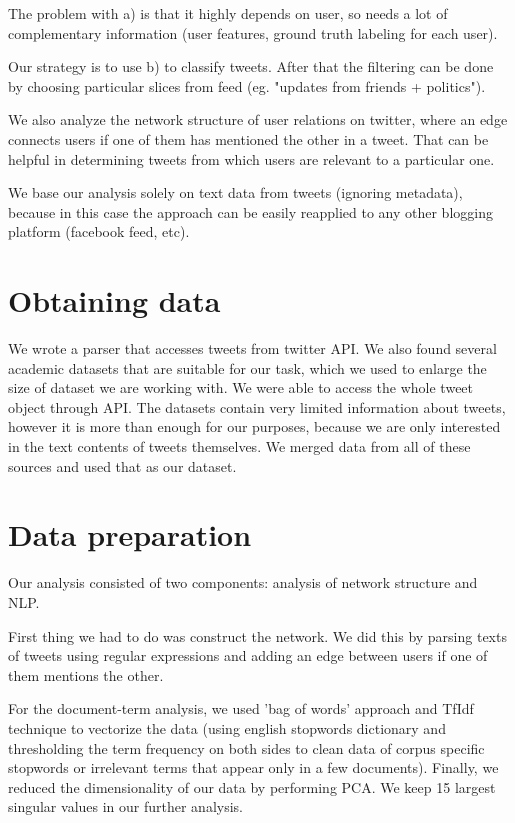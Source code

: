 \documentclass[%
 reprint,
 amsmath,amssymb,
 aps,
]{revtex4-1}
\begin{document}
The problem with a) is that it highly depends on user, so needs a lot of complementary information (user features, ground truth labeling for each user).

Our strategy is to use b) to classify tweets. After that the filtering can be done by choosing particular slices from feed (eg. "updates from friends + politics").

We also analyze the network structure of user relations on twitter, where an edge connects users if one of them has mentioned the other in a tweet. That can be helpful in determining tweets from which users are relevant to a particular one.

We base our analysis solely on text data from tweets (ignoring metadata), because in this case the approach can be easily reapplied to any other blogging platform (facebook feed, etc).



\section{Obtaining data}
We wrote a parser that accesses tweets from twitter API.
We also found several academic datasets \cite{sentiment140, sanalyt} that are suitable for our task, which we used to enlarge the size of dataset we are working with.
We were able to access the whole tweet object through API.
The datasets contain very limited information about tweets, however it is more than enough for our purposes, because we are only interested in the text contents of tweets themselves.
We merged data from all of these sources and used that as our dataset.



\section{Data preparation}

Our analysis consisted of two components: analysis of network structure and NLP.

First thing we had to do was construct the network. We did this by parsing texts of tweets using regular expressions and adding an edge between users if one of them mentions the other.

For the document-term analysis, we used 'bag of words' approach and TfIdf technique to vectorize the data (using english stopwords dictionary and thresholding the term frequency on both sides to clean data of corpus specific stopwords or irrelevant terms that appear only in a few documents). Finally, we reduced the dimensionality of our data by performing PCA. We keep 15 largest singular values in our further analysis.
\end{document}

